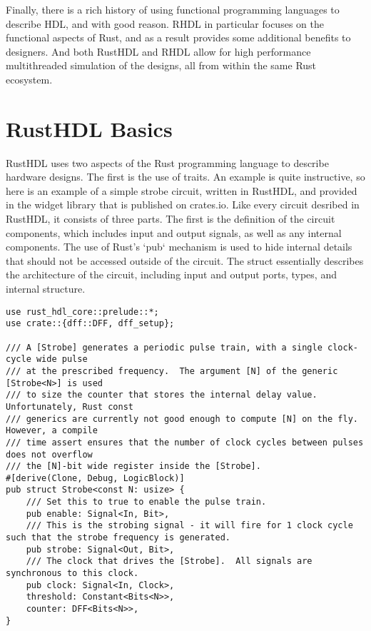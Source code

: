 \documentclass[conference]{IEEEtran}
\begin{document}
Finally, there is a rich history of using functional programming languages to describe HDL, and
with good reason.  RHDL in particular focuses on the functional aspects of Rust, and as a result 
provides some additional benefits to designers.  And both RustHDL and RHDL allow for high performance 
multithreaded simulation of the designs, all from within the same Rust ecosystem.

\section{RustHDL Basics}

RustHDL uses two aspects of the Rust programming language to describe hardware designs.  The first
is the use of traits.  An example is quite instructive, so here is an example of a simple strobe
circuit, written in RustHDL, and provided in the widget library that is published on crates.io.  Like 
every circuit desribed in RustHDL, it consists of three parts.  The first is the definition of the
circuit components, which includes input and output signals, as well as any internal components.
The use of Rust's `pub` mechanism is used to hide internal details that should not be accessed
outside of the circuit.  The struct essentially describes the architecture of the circuit, including
input and output ports, types, and internal structure.

\begin{verbatim}
use rust_hdl_core::prelude::*;
use crate::{dff::DFF, dff_setup};

/// A [Strobe] generates a periodic pulse train, with a single clock-cycle wide pulse
/// at the prescribed frequency.  The argument [N] of the generic [Strobe<N>] is used
/// to size the counter that stores the internal delay value.  Unfortunately, Rust const
/// generics are currently not good enough to compute [N] on the fly.  However, a compile
/// time assert ensures that the number of clock cycles between pulses does not overflow
/// the [N]-bit wide register inside the [Strobe].
#[derive(Clone, Debug, LogicBlock)]
pub struct Strobe<const N: usize> {
    /// Set this to true to enable the pulse train.
    pub enable: Signal<In, Bit>,
    /// This is the strobing signal - it will fire for 1 clock cycle such that the strobe frequency is generated.
    pub strobe: Signal<Out, Bit>,
    /// The clock that drives the [Strobe].  All signals are synchronous to this clock.
    pub clock: Signal<In, Clock>,
    threshold: Constant<Bits<N>>,
    counter: DFF<Bits<N>>,
}
\end{verbatim}
\end{document}
